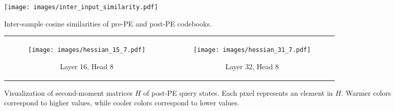 \begin{figure}[t]
    \centering
    \texttt{[image: images/inter\_input\_similarity.pdf]}
    \caption{Inter-sample cosine similarities of pre-PE and post-PE codebooks.}
    \label{fig:cosine_similarity}
\end{figure}

\begin{figure}[t]
    \centering
    \begin{tabular}{cc}
        \begin{subfigure}[b]{0.225\textwidth}
            \texttt{[image: images/hessian\_15\_7.pdf]}
            \caption{Layer 16, Head 8}
        \end{subfigure}
        &
        \begin{subfigure}[b]{0.225\textwidth}
            \texttt{[image: images/hessian\_31\_7.pdf]}
            \caption{Layer 32, Head 8}
        \end{subfigure}
    \end{tabular}

    \caption{Visualization of second-moment matrices \(H\) of post-PE query states. Each pixel represents an element in \(H\). Warmer colors correspond to higher values, while cooler colors correspond to lower values.}

    \label{fig:hessian_matrix}
\end{figure}